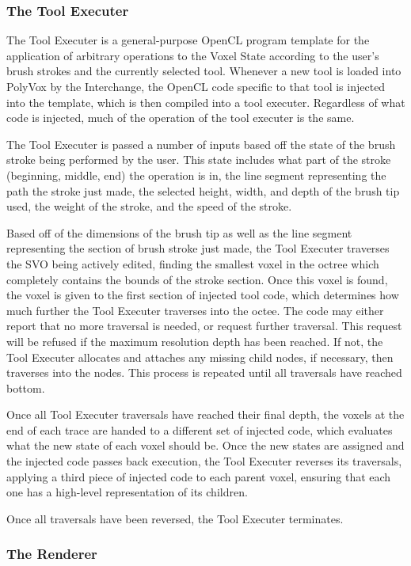 \documentclass[onecolumn, draftclsnofoot,10pt, compsoc]{IEEEtran}
\begin{document}
\subsubsection{The Tool Executer}
The Tool Executer is a general-purpose OpenCL program template for the application of arbitrary operations to the Voxel State according to the user’s brush strokes and the currently selected tool. Whenever a new tool is loaded into PolyVox by the Interchange, the OpenCL code specific to that tool is injected into the template, which is then compiled into a tool executer. Regardless of what code is injected, much of the operation of the tool executer is the same.

The Tool Executer is passed a number of inputs based off the state of the brush stroke being performed by the user. This state includes what part of the stroke (beginning, middle, end) the operation is in, the line segment representing the path the stroke just made, the selected height, width, and depth of the brush tip used, the weight of the stroke, and the speed of the stroke.

Based off of the dimensions of the brush tip as well as the line segment representing the section of brush stroke just made, the Tool Executer traverses the SVO being actively edited, finding the smallest voxel in the octree which completely contains the bounds of the stroke section. Once this voxel is found, the voxel is given to the first section of injected tool code, which determines how much further the Tool Executer traverses into the octee. The code may either report that no more traversal is needed, or request further traversal. This request will be refused if the maximum resolution depth has been reached. If not, the Tool Executer allocates and attaches any missing child nodes, if necessary, then traverses into the nodes. This process is repeated until all traversals have reached bottom.

Once all Tool Executer traversals have reached their final depth, the voxels at the end of each trace are handed to a different set of injected code, which evaluates what the new state of each voxel should be. Once the new states are assigned and the injected code passes back execution, the Tool Executer reverses its traversals, applying a third piece of injected code to each parent voxel, ensuring that each one has a high-level representation of its children.

Once all traversals have been reversed, the Tool Executer terminates.
\subsubsection{The Renderer}
\end{document}
